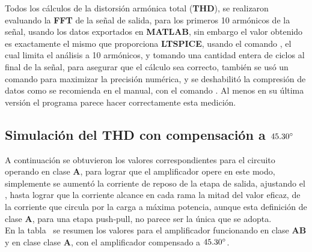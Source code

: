
Todos los cálculos de la distorsión armónica total (\textbf{THD}), se realizaron evaluando la \textbf{FFT} de la señal de salida, para los primeros \num{10} armónicos de la señal, usando los datos exportados en \textbf{MATLAB}, sin embargo el valor obtenido es exactamente el mismo que proporciona \textbf{LTSPICE}, usando el comando  \mbox{\textbf{}}, el cual limita el análisis a 10 armónicos, y tomando una cantidad entera de ciclos al final de la señal, para asegurar que el cálculo sea correcto, también se usó un comando para maximizar la precisión numérica, \mbox{\textbf{}} y se deshabilitó la compresión de datos como se recomienda en el manual, con el comando \mbox{\textbf{}}. Al menos en su última versión el programa parece hacer correctamente esta medición. 

\subsection{Simulación del \textbf{THD} con compensación a $45.30 \si[per-mode=symbol]{\degree}$ }

A continuación se obtuvieron los valores correspondientes para el circuito operando en clase \textbf{A}, para lograr que el amplificador opere en este modo, simplemente se aumentó la corriente de reposo de la etapa de salida, ajustando el , hasta lograr que la corriente alcance en cada rama la mitad del valor eficaz, de la corriente que circula por la carga a máxima potencia, aunque esta definición de clase \textbf{A}, para una etapa push-pull, no parece ser la única que se adopta. \\
En la tabla~ se resumen los valores para el amplificador funcionando en clase \textbf{AB} y en clase clase \textbf{A}, con el amplificador compensado a $45.30 \si[per-mode=symbol]{\degree}$.


 
